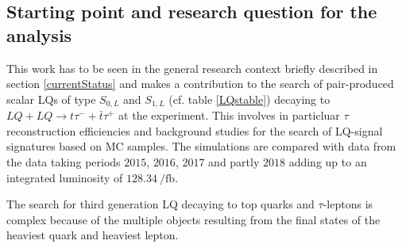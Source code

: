\subsection{Starting point and research question for the analysis}\label{startingpoint}
This work has to be seen in the general research context briefly described in section \ref{currentStatus} and makes a contribution to the search of pair-produced scalar LQs of type $S_{0,L}$ and $S_{1,L}$ (cf. table \ref{LQstable}) decaying to $LQ+LQ\rightarrow t\tau^{-}+\bar{t}\tau^{+}$ at the {\ATLAS} experiment. This involves in particluar $\tau$ reconstruction efficiencies and background studies for the search of LQ-signal signatures based on MC samples. The simulations are compared with data from the data taking periods $2015$, $2016$, $2017$ and partly $2018$ adding up to an integrated luminosity of $\SI{128.34}{\per\femto\barn}$.\par   
The search for third generation LQ decaying to top quarks and $\tau$-leptons is complex because of the multiple objects resulting from the final states of the heaviest quark and heaviest lepton. 
%
